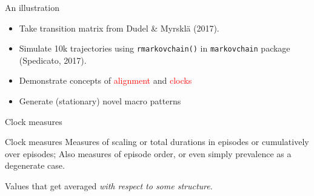 \documentclass[20pt,usenames,dvipsnames]{beamer}
\begin{document}
\begin{frame}[plain]
\Large
\centering
An illustration
\pause
\begin{itemize}[<+->]
  \item Take transition matrix from \normalsize{Dudel \& Myrskl\"a (2017)}.
  \item Simulate 10k trajectories using \texttt{rmarkovchain()} in \texttt{markovchain}
  package \normalsize{(Spedicato, 2017)}.
  \item Demonstrate concepts of \textcolor{red}{alignment} and \textcolor{red}{clocks}
  \item Generate (stationary) novel macro patterns
\end{itemize}
\end{frame}

\begin{frame}[plain]
\Large
\begin{centering}
Clock measures
\vspace{1em}
\begin{overlayarea}{\textwidth}{.4\textheight}
\end{overlayarea}
\end{centering}
\end{frame}

\begin{frame}[plain]
\Large
\begin{centering}
\begin{block}{Clock measures}
Measures of scaling or total durations in episodes or cumulatively over episodes; Also
measures of episode order, or even simply prevalence as a degenerate case.
\end{block}
\pause
Values that get averaged \emph{with respect to some structure}.
\end{centering}
\end{frame}
\end{document}
